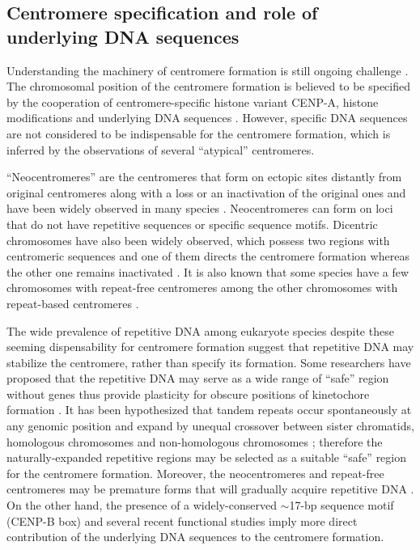 \subsection*{Centromere specification and role of underlying DNA sequences}
  Understanding the machinery of centromere formation is still ongoing challenge \cite{Plohl2014, Fukagawa2014, McKinley2016}. The chromosomal position of the centromere formation is believed to be specified by the cooperation of centromere-specific histone variant CENP-A, histone modifications and underlying DNA sequences \cite{Fukagawa2014}. However, specific DNA sequences are not considered to be indispensable for the centromere formation, which is inferred by the observations of several ``atypical'' centromeres.

  ``Neocentromeres'' are the centromeres that form on ectopic sites distantly from original centromeres along with a loss or an inactivation of the original ones and have been widely observed in many species \cite{Marshall2008, Scott2014}. Neocentromeres can form on loci that do not have repetitive sequences or specific sequence motifs. Dicentric chromosomes have also been widely observed, which possess two regions with centromeric sequences and one of them directs the centromere formation whereas the other one remains inactivated \cite{Earnshaw1985, Steiner1994, Han2006}. It is also known that some species have a few chromosomes with repeat-free centromeres among the other chromosomes with repeat-based centromeres \cite{Piras2010, Shang2010, Locke2011}.

  The wide prevalence of repetitive DNA among eukaryote species despite these seeming dispensability for centromere formation suggest that repetitive DNA may stabilize the centromere, rather than specify its formation. Some researchers have proposed that the repetitive DNA may serve as a wide range of ``safe'' region without genes thus provide plasticity for obscure positions of kinetochore formation \cite{Plohl2014, Fukagawa2014}. It has been hypothesized that tandem repeats occur spontaneously at any genomic position and expand by unequal crossover between sister chromatids, homologous chromosomes and non-homologous chromosomes \cite{Smith1976, Willard1991, Charlesworth1994}; therefore the naturally-expanded repetitive regions may be selected as a suitable ``safe'' region for the centromere formation. Moreover, the neocentromeres and repeat-free centromeres may be premature forms that will gradually acquire repetitive DNA \cite{Fukagawa2014}. On the other hand, the presence of a widely-conserved $\sim$17-bp sequence motif (CENP-B box) and several recent functional studies \cite{Henikoff2015, Aldrup-MacDonald2016} imply more direct contribution of the underlying DNA sequences to the centromere formation.


